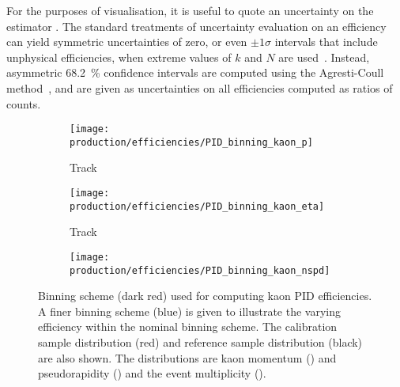 For the purposes of visualisation, it is useful to quote an uncertainty on the
estimator \effest.
The standard treatments of uncertainty evaluation on an efficiency can yield
symmetric uncertainties of zero, or even $\pm1\sigma$ intervals that include
unphysical efficiencies, when extreme values of $k$ and $N$ are
used~\cite{Paterno:2004cb}.
Instead, asymmetric \SI{68.2}{\percent} confidence intervals are computed using
the Agresti-Coull method~\cite{Agresti:2685469}, and are given as uncertainties
on all efficiencies computed as ratios of counts.

\begin{figure}
  \centering
  \begin{subfigure}[b]{0.7\textwidth}
    \texttt{[image: production/efficiencies/PID\_binning\_kaon\_p]}
    \caption{Track \ptot}
    \label{fig:prod:effs:pid:binning:kaon:p}
  \end{subfigure}
  \begin{subfigure}[b]{0.7\textwidth}
    \texttt{[image: production/efficiencies/PID\_binning\_kaon\_eta]}
    \caption{Track \Eta}
    \label{fig:prod:effs:pid:binning:kaon:eta}
  \end{subfigure}
  \begin{subfigure}[b]{0.7\textwidth}
    \texttt{[image: production/efficiencies/PID\_binning\_kaon\_nspd]}
    \caption{\nspd}
    \label{fig:prod:effs:pid:binning:kaon:nspd}
  \end{subfigure}

  \caption{%
    Binning scheme (dark red) used for computing kaon \ac{PID} efficiencies.
    A finer binning scheme (blue) is given to illustrate the varying efficiency
    within the nominal binning scheme.
    The calibration sample distribution (red) and reference sample distribution
    (black) are also shown.
    The distributions are kaon momentum
    () and pseudorapidity
    () and the event multiplicity
    ().
  }
  \label{fig:prod:pid:binning:kaon}
\end{figure}


